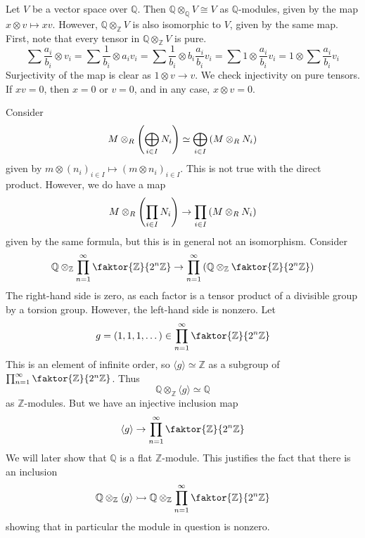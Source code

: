 \begin{example}
    Let \( V \) be a vector space over \( \mathbb Q \).
    Then \( \mathbb Q \otimes_{\mathbb Q} V \cong V \) as \( \mathbb Q \)-modules, given by the map \( x \otimes v \mapsto xv \).
    However, \( \mathbb Q \otimes_{\mathbb Z} V \) is also isomorphic to \( V \), given by the same map.
    First, note that every tensor in \( \mathbb Q \otimes_{\mathbb Z} V \) is pure.
    \[ \sum \frac{a_i}{b_i} \otimes v_i = \sum \frac{1}{b_i} \otimes a_i v_i = \sum \frac{1}{b_i} \otimes b_i \frac{a_i}{b_i} v_i = \sum 1 \otimes \frac{a_i}{b_i} v_i = 1 \otimes \sum \frac{a_i}{b_i} v_i \]
    Surjectivity of the map is clear as \( 1 \otimes v \to v \).
    We check injectivity on pure tensors.
    If \( xv = 0 \), then \( x = 0 \) or \( v = 0 \), and in any case, \( x \otimes v = 0 \).
\end{example}
\begin{example}
    Consider
    \[ M \otimes_R \qty(\bigoplus_{i \in I} N_i) \simeq \bigoplus_{i \in I} \qty(M \otimes_R N_i) \]
    given by \( m \otimes (n_i)_{i \in I} \mapsto (m \otimes n_i)_{i \in I} \).
    This is not true with the direct product.
    However, we do have a map
    \[ M \otimes_R \qty(\prod_{i \in I} N_i) \to \prod_{i \in I} \qty(M \otimes_R N_i) \]
    given by the same formula, but this is in general not an isomorphism.
    Consider
    \[ \mathbb Q \otimes_{\mathbb Z} \prod_{n = 1}^\infty \faktor{\mathbb Z}{2^n \mathbb Z} \to \prod_{n = 1}^\infty \qty(\mathbb Q \otimes_{\mathbb Z} \faktor{\mathbb Z}{2^n \mathbb Z}) \]
    The right-hand side is zero, as each factor is a tensor product of a divisible group by a torsion group.
    However, the left-hand side is nonzero.
    Let
    \[ g = (1, 1, 1, \dots) \in \prod_{n = 1}^\infty \faktor{\mathbb Z}{2^n \mathbb Z} \]
    This is an element of infinite order, so \( \langle g \rangle \simeq \mathbb Z \) as a subgroup of \( \prod_{n = 1}^\infty \faktor{\mathbb Z}{2^n \mathbb Z} \).
    Thus
    \[ \mathbb Q \otimes_{\mathbb Z} \langle g \rangle \simeq \mathbb Q \]
    as \( \mathbb Z \)-modules.
    But we have an injective inclusion map
    \[ \langle g \rangle \to \prod_{n = 1}^\infty \faktor{\mathbb Z}{2^n \mathbb Z} \]
    We will later show that \( \mathbb Q \) is a flat \( \mathbb Z \)-module.
    This justifies the fact that there is an inclusion
    \[ \mathbb Q \otimes_{\mathbb Z} \langle g \rangle \rightarrowtail \mathbb Q \otimes_{\mathbb Z} \prod_{n = 1}^\infty \faktor{\mathbb Z}{2^n \mathbb Z} \]
    showing that in particular the module in question is nonzero.
\end{example}
